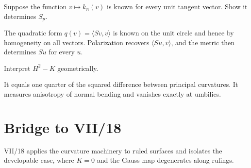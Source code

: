 \begin{problem}\label{prob:vii17-ch04}
Suppose the function \(v\mapsto k_n(v)\) is known for every unit tangent vector. Show it determines \(S_p\).
\end{problem}
\begin{solution}
The quadratic form \(q(v)=\langle Sv,v\rangle\) is known on the unit circle and hence by homogeneity on all vectors. Polarization recovers \(\langle Su,v\rangle\), and the metric then determines \(Su\) for every \(u\).
\end{solution}

\begin{problem}\label{prob:vii17-ch05}
Interpret \(H^2-K\) geometrically.
\end{problem}
\begin{solution}
It equals one quarter of the squared difference between principal curvatures. It measures anisotropy of normal bending and vanishes exactly at umbilics.
\end{solution}

\section*{Bridge to VII/18}
VII/18 applies the curvature machinery to ruled surfaces and isolates the developable case, where \(K=0\) and the Gauss map degenerates along rulings.
